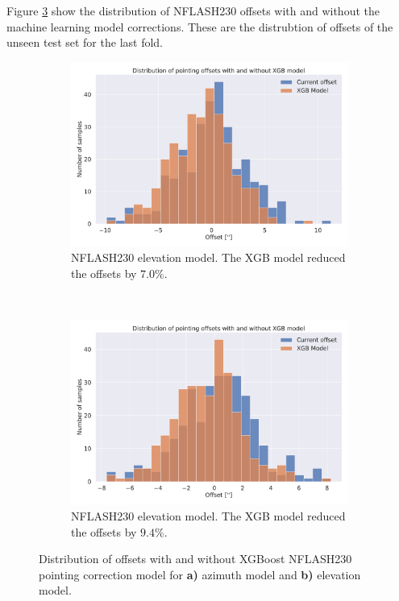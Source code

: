\newpage 
Figure \ref{fig:histogram_selected_result_xgb} show the distribution of NFLASH230 offsets with and without the machine learning model corrections.
These are the distrubtion of offsets of the unseen test set for the last fold.



\begin{figure}[H]
    \centering
    \begin{subfigure}[t]{\textwidth}
        \centering
        \includegraphics[width=\textwidth]{Results/hist_XGB_ds2_tp5_k30_uncorr_az_test.pdf}
        \caption{NFLASH230 elevation model. The XGB model reduced the offsets by $7.0\%$.}
        \label{subfig:hist_lastfold_nflash230_az}
    \end{subfigure}
    \\
    \begin{subfigure}[t]{\textwidth}
       \centering
       \includegraphics[width=\textwidth]{Results/hist_XGB_ds2_tp5_k40_uncorr_el_test.pdf}
       \caption{NFLASH230 elevation model. The XGB model reduced the offsets by $9.4\%$.}
       \label{subfig:hist_lastfold_nflash230_el}
    \end{subfigure}
    \caption{Distribution of offsets with and without XGBoost NFLASH230 pointing correction model for \textbf{a)} azimuth model and \textbf{b)} elevation model.}
    \label{fig:histogram_selected_result_xgb}
\end{figure}


